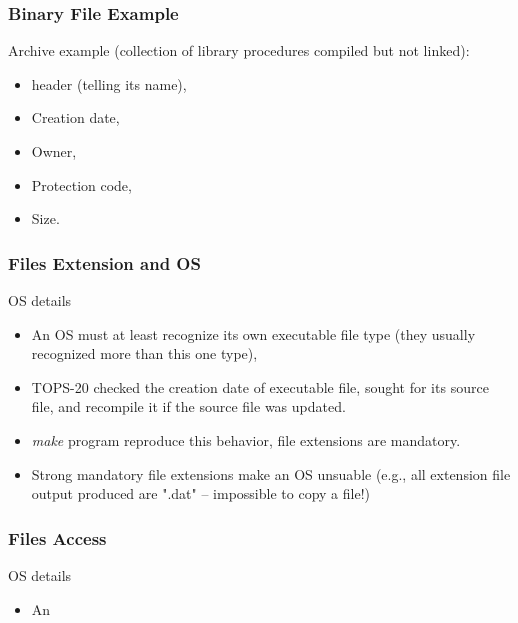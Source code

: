 \begin{frame}
  \frametitle{Binary File Example}
  \begin{block}{Archive example (collection of library procedures compiled but not linked):}
    \begin{itemize}
      \item header (telling its name),
      \item Creation date,
      \item Owner,
      \item Protection code,
      \item Size.
    \end{itemize}
  \end{block}
\end{frame}

\begin{frame}
  \frametitle{Files Extension and OS}
  \begin{block}{OS details}
    \begin{itemize}
      \item An OS must at least recognize its own executable file type (they usually recognized more than this one type),
      \item TOPS-20 checked the creation date of executable file, sought for its source file, and recompile it if the source file was updated.
      \item \emph{make} program reproduce this behavior, file extensions are mandatory.
      \item Strong mandatory file extensions make an OS unsuable (e.g., all extension file output produced are ".dat" -- impossible to copy a file!)
    \end{itemize}
  \end{block}
\end{frame}

\begin{frame}
  \frametitle{Files Access}
  \begin{block}{OS details}
    \begin{itemize}
      \item An
    \end{itemize}
  \end{block}
\end{frame}
